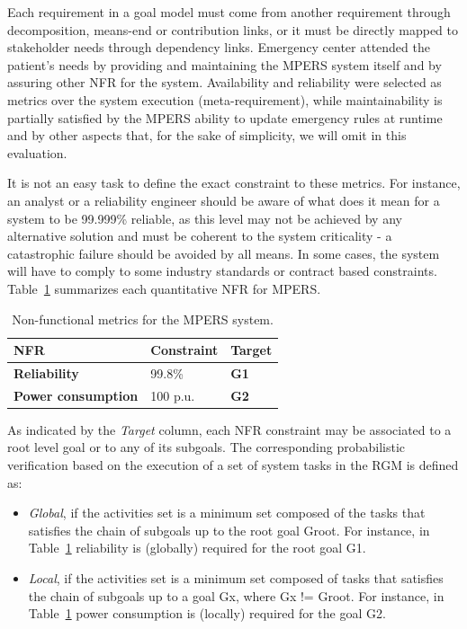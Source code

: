 Each requirement in a goal model must come from another requirement through decomposition, means-end or contribution links, or it must be directly mapped to stakeholder needs through dependency links. Emergency center attended the patient's needs by providing and maintaining the MPERS system itself and by assuring other NFR for the system. Availability and reliability were selected as metrics over the system execution (meta-requirement), while maintainability is partially satisfied by the MPERS ability to update emergency rules at runtime and by other aspects that, for the sake of simplicity, we will omit in this evaluation.

It is not an easy task to define the exact constraint to these metrics. For instance, an analyst or a reliability engineer should be aware of what does it mean for a system to be 99.999\% reliable, as this level may not be achieved by any alternative solution and must be coherent to the system criticality - a catastrophic failure should be avoided by all means. In some cases, the system will have to comply to some industry standards or contract based constraints. Table~\ref{tab:MPERS_NFR} summarizes each quantitative NFR for MPERS.
\medskip

\begin{table}[h]\label{tab:MPERS_NFR}
{\renewcommand{\arraystretch}{1.5}
\begin{tabularx}{\textwidth}{@{}XXX@{}}
\toprule
\textbf{NFR}               & \textbf{Constraint} & \textbf{Target}        \\ \midrule
\textbf{Reliability}       & 99.8\%            & \textbf{G1} \\
\textbf{Power consumption} & 100 p.u.            & \textbf{G2}          \\ \bottomrule
\end{tabularx}
}
\caption{Non-functional metrics for the MPERS system.}
\end{table}


As indicated by the \textit{Target} column, each NFR constraint may be associated to a root level goal or to any of its subgoals. The corresponding probabilistic verification based on the execution of a set of system tasks in the RGM is defined as:

\begin{itemize}

\item \textit{Global}, if the activities set is a minimum set composed of the tasks that satisfies the chain of subgoals up to the root goal Groot. For instance, in Table~\ref{tab:MPERS_NFR} reliability is (globally) required for the root goal G1.
\medskip

\item \textit{Local}, if the activities set is a minimum set composed of tasks that satisfies the chain of subgoals up to a goal Gx, where Gx != Groot. For instance, in Table~\ref{tab:MPERS_NFR} power consumption is (locally) required for the goal G2.
\medskip

\end{itemize}

